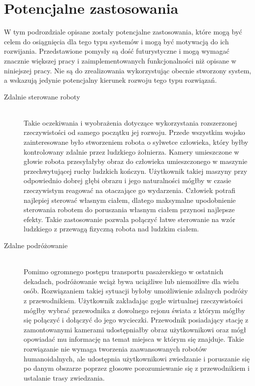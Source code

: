 \documentclass[a4paper,11pt,twoside]{report}
\theoremstyle{definition}
\begin{document}
\section{Potencjalne zastosowania}

W tym podrozdziale opisane zostały potencjalne zastosowania, które mogą być celem do osiągnięcia dla tego typu systemów i mogą być motywacją do ich rozwijania. Przedstawione pomysły są dość futurystyczne i mogą wymagać znacznie większej pracy i zaimplementowanych funkcjonalności niż opisane w niniejszej pracy. Nie są do zrealizowania wykorzystując obecnie stworzony system, a wskazują jedynie potencjalny kierunek rozwoju tego typu rozwiązań.

\begin{description}
\item [Zdalnie sterowane roboty] \hfill \\
Takie oczekiwania i wyobrażenia dotyczące wykorzystania rozszerzonej rzeczywistości od samego początku jej rozwoju. Przede wszystkim wojsko zainteresowane było stworzeniem robota o sylwetce człowieka, który byłby kontrolowany zdalnie przez ludzkiego żołnierza. Kamery umieszczone w głowie robota przesyłałyby obraz do człowieka umieszczonego w maszynie przechwytującej ruchy ludzkich kończyn. Użytkownik takiej maszyny przy odpowiednio dobrej głębi obrazu i jego naturalności mógłby w czasie rzeczywistym reagować na otaczające go wydarzenia. Człowiek potrafi najlepiej sterować własnym ciałem, dlatego maksymalne upodobnienie sterowania robotem do poruszania własnym ciałem przynosi najlepsze efekty. Takie zastosowanie pozwala połączyć łatwe sterowanie na wzór ludzkiego z przewagą fizyczną robota nad ludzkim ciałem.
  
\item [Zdalne podróżowanie] \hfill \\
Pomimo ogromnego postępu transportu pasażerskiego w ostatnich dekadach, podróżowanie wciąż bywa uciążliwe lub niemożliwe dla wielu osób. Rozwiązaniem takiej sytuacji byłoby umożliwienie zdalnych podróży z przewodnikiem. Użytkownik zakładając gogle wirtualnej rzeczywistości mógłby wybrać przewodnika z dowolnego rejonu świata z którym mógłby się połączyć i dołączyć do jego wycieczki. Przewodnik posiadający stację z zamontowanymi kamerami udostępniałby obraz użytkownikowi oraz mógł opowiadać  mu informację na temat miejsca w którym się znajduje. Takie rozwiązanie nie wymaga tworzenia zaawansowanych robotów humanoidalnych, ale udostępnia użytkownikowi zwiedzanie i poruszanie się po danym obszarze poprzez głosowe porozumiewanie się z przewodnikiem i ustalanie trasy zwiedzania.
\end{description}
\end{document}
